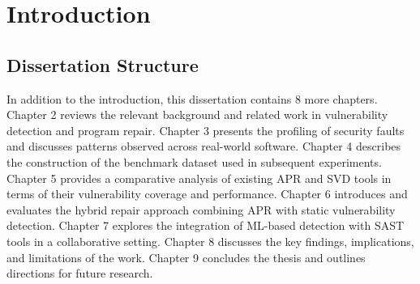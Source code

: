 \chapter{Introduction} \label{chap:intro}


%
%







\section{Dissertation Structure} \label{sec:struct}

In addition to the introduction, this dissertation contains 8 more chapters. Chapter 2 reviews the relevant background and related work in vulnerability detection and program repair. Chapter 3 presents the profiling of security faults and discusses patterns observed across real-world software. Chapter 4 describes the construction of the benchmark dataset used in subsequent experiments. Chapter 5 provides a comparative analysis of existing APR and SVD tools in terms of their vulnerability coverage and performance. Chapter 6 introduces and evaluates the hybrid repair approach combining APR with static vulnerability detection. Chapter 7 explores the integration of ML-based detection with SAST tools in a collaborative setting. Chapter 8 discusses the key findings, implications, and limitations of the work. Chapter 9 concludes the thesis and outlines directions for future research.